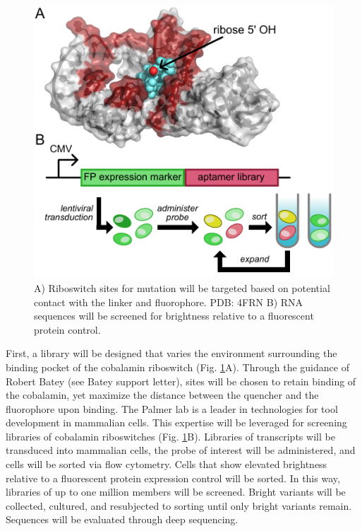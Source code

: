\begin{figure}
\begin{centering}
\includegraphics[width=\textwidth]{figures/aim2.pdf}

\end{centering}
\footnotesize
\caption{\label{figure:aim2}
A) Riboswitch sites for mutation will be targeted based on potential contact with the linker and fluorophore. PDB: 4FRN\cite{JohnsonJrB12cofactorsdirectly2012} B) RNA sequences will be screened for brightness relative to a fluorescent protein control.
}
\end{figure}

First, a library will be designed that varies the environment surrounding the binding pocket of the cobalamin riboswitch (Fig. \ref{figure:aim2}A). Through the guidance of Robert Batey (see Batey support letter), sites will be chosen to retain binding of the cobalamin, yet maximize the distance between the quencher and the fluorophore upon binding\cite{JohnsonJrB12cofactorsdirectly2012}.
The Palmer lab is a leader in technologies for tool development in mammalian cells\cite{FiedlerDropletMicrofluidicFlow2017,DeanHighSpeedMultiparameterPhotophysical2015}.
This expertise will be leveraged for screening libraries of cobalamin riboswitches (Fig. \ref{figure:aim2}B). Libraries of transcripts will be transduced into mammalian cells, the probe of interest will be administered, and cells will be sorted via flow cytometry. Cells that show elevated brightness relative to a fluorescent protein expression control will be sorted.
In this way, libraries of up to one million members will be screened. Bright variants will be collected, cultured, and resubjected to sorting until only bright variants remain. Sequences will be evaluated through deep sequencing.

